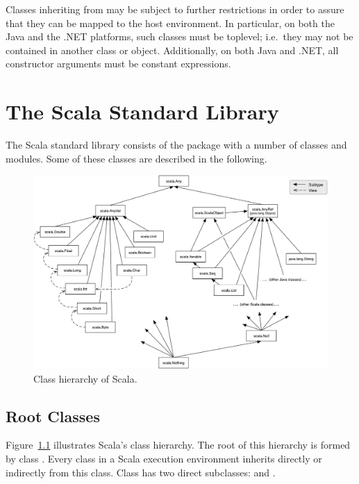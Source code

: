 Classes inheriting from  may be
subject to further restrictions in order to assure that they can be
mapped to the host environment. In particular, on both the Java and
the .NET platforms, such classes must be toplevel; i.e.\ they may not
be contained in another class or object.  Additionally, on both
Java and .NET, all constructor arguments must be constant expressions.


\chapter{The Scala Standard Library}

The Scala standard library consists of the package  with a
number of classes and modules. Some of these classes are described in
the following.

\begin{figure}
\centering
\includegraphics[scale=0.40]{classhierarchy}
\vspace*{-1.5mm}
\caption{Class hierarchy of Scala.}
\label{fig:class-hierarchy}
\end{figure}

\section{Root Classes}
\label{sec:cls-root}
\label{sec:cls-any}
\label{sec:cls-object}

Figure~\ref{fig:class-hierarchy} illustrates Scala's class
hierarchy.
The root of this hierarchy is formed by class .
Every class in a Scala execution environment inherits directly or
indirectly from this class.  Class  has two direct
subclasses:  and .

